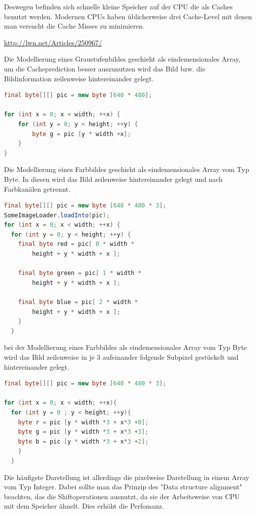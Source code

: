 \documentclass[tog]{acmsiggraph}
\begin{document}
Deswegen befinden sich schnelle kleine Speicher auf der CPU die als  Caches benutzt werden.
Modernen CPUs haben üblicherweise drei Cache-Level mit denen man versucht die Cache Misses zu minimieren.

{\small\url{http://lwn.net/Articles/250967/}}


Die Modellierung eines Graustufenbildes geschieht als eindemensionales Array, um die Cacheprediction besser auszunutzen wird das Bild bzw. die Bildinformation zeilenweise hintereinander gelegt.

\begin{lstlisting}[language=Java]
final byte[][] pic = new byte [640 * 480];

for (int x = 0; x < width; ++x) {
	for (int y = 0; y < height; ++y) {
		byte g = pic [y * width +x];
	}
}
\end{lstlisting}

Die Modellierung eines Farbbildes geschieht als eindemensionales Array vom Typ Byte.
In diesen wird das Bild zeilenweise hintereinander gelegt und nach Farbkanälen getrennt.

\begin{lstlisting}[language=Java]
final byte[][] pic = new byte [640 * 480 * 3];
SomeImageLoader.loadInto(pic);
for (int x = 0; x < width; ++x) {
  for (int y = 0; y < height; ++y) {
	final byte red = pic[ 0 * width * 
		height + y * width + x ];

	final byte green = pic[ 1 * width * 
		height + y * width + x ];

	final byte blue = pic[ 2 * width * 
		height + y * width + x ];
    }
  }
\end{lstlisting}

bei der Modellierung eines Farbbildes als eindemensionales Array vom Typ Byte wird das Bild zeilenweise in je 3 aufeinander folgende Subpixel gestückelt und hintereinander gelegt.

\begin{lstlisting}[language=Java]
final byte[][] pic = new byte [640 * 480 * 3];

for (int x = 0; x < width; ++x){
  for (int y = 0 ; y < height; ++y){
    byte r = pic [y * width *3 + x*3 +0]; 
    byte g = pic [y * width *3 + x*3 +3];
    byte b = pic [y * width *3 + x*3 +2];
    }
  }
\end{lstlisting}

Die häufigste Darstellung ist allerdings die pixelweise Darstellung in einem Array vom Typ Integer.
Dabei sollte man das Prinzip des "Data structure alignment" beachten, das die Shiftoperationen ausnutzt, da sie der Arbeitsweise von CPU mit dem  Speicher ähnelt. Dies erhöht die Perfomanz. 
\end{document}
